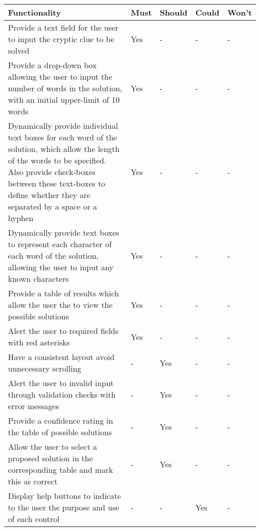 \begin{table}[H]
	\centering
	\small
    \begin{tabular}{|p{9.3cm}|p{1.3cm}|p{1.3cm}|p{1.3cm}|p{1.3cm}|}
    \hline
    \textbf{Functionality} & \textbf{Must} & \textbf{Should} & \textbf{Could} & \textbf{Won't} \\ \hline

    Provide a text field for the user to input the cryptic clue to be solved &
    Yes & - & - & - \\ \hline

    Provide a drop-down box allowing the user to input the number of words in the solution, with an initial upper-limit of 10 words &
    Yes & - & - & - \\ \hline

    Dynamically provide individual text boxes for each word of the solution, which allow the length of the words to be specified. Also provide check-boxes between these text-boxes to define whether they are separated by a space or a hyphen &
    Yes & - & - & - \\ \hline

    Dynamically provide text boxes to represent each character of each word of the solution, allowing the user to input any known characters &
    Yes & - & - & - \\ \hline

    Provide a table of results which allow the user the to view the possible solutions &
    Yes & - & - & - \\ \hline

    Alert the user to required fields with red asterisks &
    Yes & - & - & - \\ \hline

    Have a consistent layout avoid unnecessary scrolling &
    - & Yes & - & - \\ \hline

    Alert the user to invalid input through validation checks with error messages &
    - & Yes & - & - \\ \hline

    Provide a confidence rating in the table of possible solutions &
    - & Yes & - & - \\ \hline

    Allow the user to select a proposed solution in the corresponding table and mark this as correct &
    - & Yes & - & - \\ \hline

    Display help buttons to indicate to the user the purpose and use of each control &
    - & - & Yes & - \\ \hline


\end{tabular}
\end{table}

